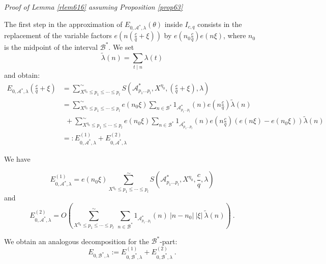 \documentclass{amsart}
\numberwithin{equation}{subsection}
\begin{document}
\noindent\textit{Proof of Lemma \ref{rlem616} assuming Proposition \ref{prop63} }

The first step in the approximation of $E_{0, \mathcal{A}^*, \lambda}(\theta)$ inside $I_{c,q}$ consists in the replacement of the variable factors $e\left( n\left(\frac{c}{q}+\xi\right)\right)$ by $e\left(n_0\frac{c}{q}\right)e(n\xi)$, where $n_0$ is the midpoint of the interval $\mathcal{B}^*$. We set
$$\tilde{\lambda}(n)=\sum_{t\mid n} \lambda (t)$$
and obtain:
\begin{align*}
E_{0, \mathcal{A}^*, \lambda}\left(\frac{c}{q}+\xi\right)& =\sum_{X^{\eta_0}\leq p_1\leq \cdots\leq p_l}^\sim S\left(\mathcal{A}^*_{p_1\ldots p_l}, X^{\eta_0}, \left(\frac{c}{q}+\xi\right), \lambda\right)   \tag{6.4}\\
&=\sum_{X^{\eta_0}\leq p_1\leq \cdots\leq p_l}^\sim e(n_0\xi) \sum_{n\in\mathcal{B}^*}  1_{\mathcal{A}^*_{p_1\ldots p_l}}(n) e\left(n\frac{c}{q}\right) \tilde{\lambda}(n)\\
&\ \ +\sum_{X^{\eta_0}\leq p_1\leq \cdots\leq p_l}^\sim e(n_0\xi) \sum_{n\in\mathcal{B}^*}  1_{\mathcal{A}^*_{p_1\ldots p_l}}(n) e\left(n\frac{c}{q}\right) (e(n\xi)-e(n_0\xi))\tilde{\lambda}(n)\\
&=:  E_{0, \mathcal{A}^*, \lambda}^{(1)}+ E_{0, \mathcal{A}^*, \lambda}^{(2)}
\end{align*}

We have

\[
E_{0, \mathcal{A}^*, \lambda}^{(1)} = e(n_0\xi)\sum_{X^{\eta_0}\leq p_1\leq \cdots \leq p_l}^\sim  S\left(\mathcal{A}^*_{p_1\ldots p_l}, X^{\eta_0}, \frac{c}{q}, \lambda\right)    \tag{6.5}
\]
and
\[
E_{0, \mathcal{A}^*, \lambda}^{(2)} = O\left(\sum_{X^{\eta_0}\leq p_1\leq \cdots \leq p_l}^\sim \ \sum_{n\in\mathcal{B}^*} 1_{\mathcal{A}^*_{p_1\ldots p_l}}(n)\: |n-n_0|\:|\xi| \:\tilde{\lambda}(n)\right) \:.     \tag{6.6}
\]

We obtain an analogous decomposition for the $\mathcal{B}^*$-part:
$$E_{0, \mathcal{B}^*, \lambda}:=E^{(1)}_{0,\mathcal{B}^*, \lambda }+E_{0, \mathcal{B}^*, \lambda}^{(2)} \:.$$
\end{document}
